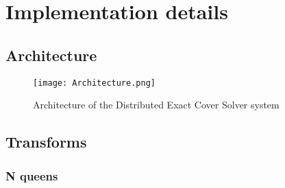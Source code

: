 
\chapter{Implementation details}
\label{implementation}


\section{Architecture}


\begin{figure}[htb]
	\centering 
	\texttt{[image: Architecture.png]}
	\caption{Architecture of the Distributed Exact Cover Solver system}
	\label{fig:architecture}
\end{figure}



\section{Transforms}


\subsection{N queens}
\label{queens_trans}





